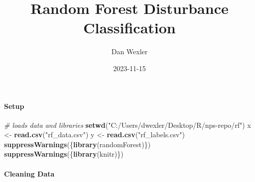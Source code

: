 \documentclass[
]{article}
\title{Random Forest Disturbance Classification}
\author{Dan Wexler}
\date{2023-11-15}
\newenvironment{Shaded}{\begin{snugshade}}{\end{snugshade}}
\newcommand{\CommentTok}[1]{\textcolor[rgb]{0.56,0.35,0.01}{\textit{#1}}}
\newcommand{\FunctionTok}[1]{\textcolor[rgb]{0.13,0.29,0.53}{\textbf{#1}}}
\newcommand{\NormalTok}[1]{#1}
\newcommand{\OtherTok}[1]{\textcolor[rgb]{0.56,0.35,0.01}{#1}}
\newcommand{\StringTok}[1]{\textcolor[rgb]{0.31,0.60,0.02}{#1}}
\begin{document}
\maketitle

{
\setcounter{tocdepth}{4}
\tableofcontents
}
\hypertarget{setup}{%
\paragraph{Setup}\label{setup}}

\begin{Shaded}
\begin{Highlighting}[]
\CommentTok{\# loads data and libraries}
\FunctionTok{setwd}\NormalTok{(}\StringTok{"C:/Users/dwexler/Desktop/R/nps{-}repo/rf"}\NormalTok{)}
\NormalTok{x }\OtherTok{\textless{}{-}} \FunctionTok{read.csv}\NormalTok{(}\StringTok{"rf\_data.csv"}\NormalTok{)}
\NormalTok{y }\OtherTok{\textless{}{-}} \FunctionTok{read.csv}\NormalTok{(}\StringTok{"rf\_labels.csv"}\NormalTok{)}
\FunctionTok{suppressWarnings}\NormalTok{(\{}\FunctionTok{library}\NormalTok{(randomForest)\})}
\FunctionTok{suppressWarnings}\NormalTok{(\{}\FunctionTok{library}\NormalTok{(knitr)\})}
\end{Highlighting}
\end{Shaded}

\hypertarget{cleaning-data}{%
\paragraph{Cleaning Data}\label{cleaning-data}}
\end{document}
